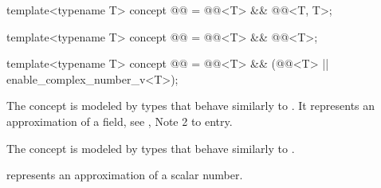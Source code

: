 \begin{itemdecl}
template<typename T>
concept @@ = @@<T> && @@<T, T>;

template<typename T>
concept @@ = @@<T> && @@<T>;

template<typename T>
concept @@ = @@<T> && (@@<T> || enable_complex_number_v<T>);
\end{itemdecl}

\begin{itemdescr}
\pnum
\begin{note}
The  concept is modeled by types
that behave similarly to .
It represents an approximation of a field, see , Note 2 to entry.
\end{note}

\pnum
\begin{note}
The  concept is modeled by types
that behave similarly to .
\end{note}

\pnum
\begin{note}
 represents an approximation of a scalar number.
\end{note}
\end{itemdescr}
